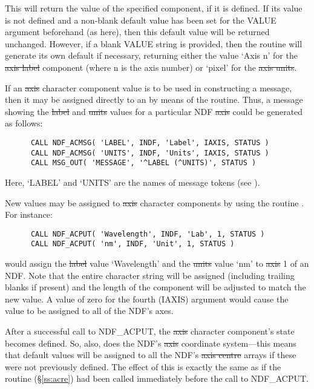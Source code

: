 This will return the value of the specified component, if it is defined.
If its value is not defined and a non-blank default value has been set for
the VALUE argument beforehand (as here), then this default value will be
returned unchanged. 
However, if a blank VALUE string is provided, then the routine will generate
its own default if necessary, returning either the value `Axis n' for the
\st{axis label\/} component (where n is the axis number) or `pixel' for the
\st{axis units}.

If an \st{axis\/} character component value is to be used in
constructing a message, then it may be assigned directly to an
 by means of the 
routine.
Thus, a message showing the \st{label\/} and \st{units\/} values for a
particular NDF \st{axis\/} could be generated as follows: 

\small
\begin{verbatim}
      CALL NDF_ACMSG( 'LABEL', INDF, 'Label', IAXIS, STATUS )
      CALL NDF_ACMSG( 'UNITS', INDF, 'Units', IAXIS, STATUS )
      CALL MSG_OUT( 'MESSAGE', '^LABEL (^UNITS)', STATUS )
\end{verbatim}
\normalsize

Here, `LABEL' and `UNITS' are the names of message tokens (see
).

New values may be assigned to \st{axis\/} character components by using the
routine . 
For instance:

\small
\begin{verbatim}
      CALL NDF_ACPUT( 'Wavelength', INDF, 'Lab', 1, STATUS )
      CALL NDF_ACPUT( 'nm', INDF, 'Unit', 1, STATUS )
\end{verbatim}
\normalsize

would assign the \st{label\/} value `Wavelength' and the \st{units\/} value 
`nm' to \st{axis\/} 1 of an NDF.
Note that the entire character string will be assigned (including trailing
blanks if present) and the length of the component will be adjusted to match
the new value. 
A value of zero for the fourth (IAXIS) argument would cause the value to be
assigned to all of the NDF's axes. 

After a successful call to NDF\_ACPUT, the \st{axis\/} character
component's state becomes defined. 
So, also, does the NDF's \st{axis\/} coordinate system---this means that
default values will be assigned to all the NDF's \st{axis centre\/} arrays
if these were not previously defined. 
The effect of this is exactly the same as if the routine 
(\S\ref{ss:acre}) had been called immediately before the call to NDF\_ACPUT. 

